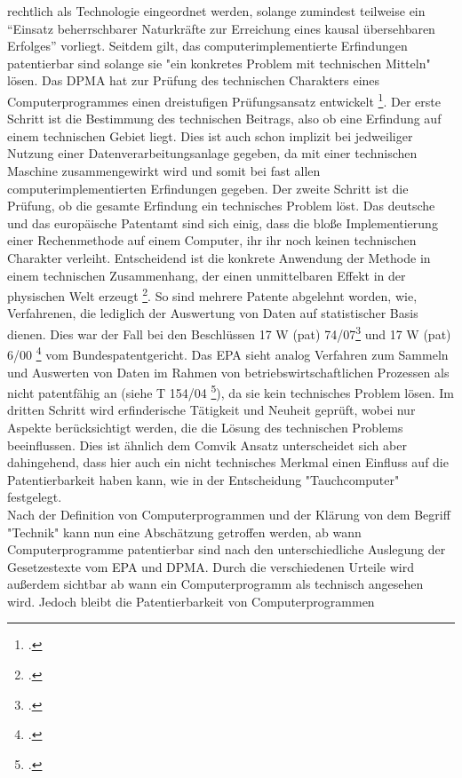 rechtlich als Technologie eingeordnet werden, solange 
zumindest teilweise ein 
“Einsatz beherrschbarer Naturkräfte zur Erreichung eines kausal übersehbaren Erfolges”
vorliegt. Seitdem gilt,
das computerimplementierte Erfindungen patentierbar sind
solange sie "ein konkretes Problem mit technischen Mitteln" lösen.
Das DPMA hat zur Prüfung des technischen Charakters eines 
Computerprogrammes einen dreistufigen Prüfungsansatz entwickelt \footcite{DPMAPatentschutz}.
Der erste Schritt ist die Bestimmung des technischen Beitrags,
also ob eine Erfindung auf einem technischen Gebiet liegt. 
Dies ist auch schon implizit bei jedweiliger Nutzung einer Datenverarbeitungsanlage
gegeben, da mit einer technischen Maschine zusammengewirkt wird
und somit bei fast allen computerimplementierten Erfindungen gegeben.
Der zweite Schritt ist die Prüfung, ob die gesamte Erfindung ein technisches Problem löst.
Das deutsche und das europäische Patentamt sind sich einig,
dass die bloße Implementierung 
einer Rechenmethode auf einem Computer, ihr
ihr noch keinen technischen Charakter verleiht. 
Entscheidend ist die konkrete Anwendung der Methode 
in einem technischen Zusammenhang, der einen unmittelbaren Effekt in der 
physischen Welt erzeugt \footcite{melullisEPUArt522023}.
So sind mehrere Patente abgelehnt worden,
wie, Verfahrenen, 
die lediglich der Auswertung von Daten auf statistischer Basis dienen.
Dies war der Fall bei den Beschlüssen 17 W (pat) 74/07\footcite{BPatG10012012}
und 17 W (pat) 6/00 \footcite{BPatG01032001} vom Bundespatentgericht.
Das EPA sieht analog Verfahren zum Sammeln und Auswerten von Daten 
im Rahmen von betriebswirtschaftlichen Prozessen als nicht patentfähig an 
(siehe T 154/04 \footcite{EuropaischesPatentamt152006}),
da sie kein technisches Problem lösen.
Im dritten Schritt wird erfinderische Tätigkeit und Neuheit 
geprüft, wobei nur Aspekte berücksichtigt werden,
die die Lösung des technischen Problems beeinflussen.
Dies ist ähnlich dem Comvik Ansatz unterscheidet sich
aber dahingehend, dass hier auch ein nicht technisches
Merkmal einen Einfluss auf die Patentierbarkeit haben kann,
wie in der Entscheidung "Tauchcomputer" festgelegt.
\\
Nach der Definition von Computerprogrammen und der Klärung von dem Begriff
"Technik" kann nun eine Abschätzung getroffen werden, 
ab wann Computerprogramme patentierbar sind nach den
unterschiedliche Auslegung der Gesetzestexte vom EPA und DPMA. 
Durch die verschiedenen Urteile wird außerdem sichtbar 
ab wann ein Computerprogramm als technisch angesehen wird.
Jedoch bleibt die Patentierbarkeit von Computerprogrammen 
